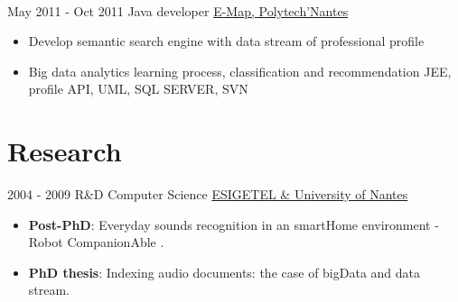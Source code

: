 \documentclass[letterpaper]{twentysecondcv} %
\begin{document}
\begin{twenty}
{\begin{itemize}
	    \end{itemize}
	    }
	   \\
	    \twentyitem
	    {May 2011 -}
	    {Oct 2011}
	    {Java developer}
	    {\href{}{E-Map, Polytech'Nantes}}
	    {}
	    {
	    \begin{itemize}
	    \item Develop semantic search engine with data stream of professional profile
	    \item Big data analytics learning process, classification and recommendation
	\medskip   \newline \footnotesize  JEE, profile API, UML, SQL SERVER, SVN
	    \end{itemize}
	    }


\end{twenty}

\section{Research}
\begin{twenty}
	\twentyitem
    	{2004 - 2009}
		{}
        {R\&D Computer Science}
        {\href{https://www.univ-nantes.fr/}{ESIGETEL \& University of Nantes}}
        {}
	       {       
	        {
	       \begin{itemize}
	       \item \textbf{Post-PhD}: Everyday sounds recognition in an smartHome environment - Robot CompanionAble .
	       \item	\textbf{PhD thesis}: Indexing audio documents: the case of bigData and data stream.
	      \end{itemize}
			}
	       }
  
\end{twenty}

\end{document}
